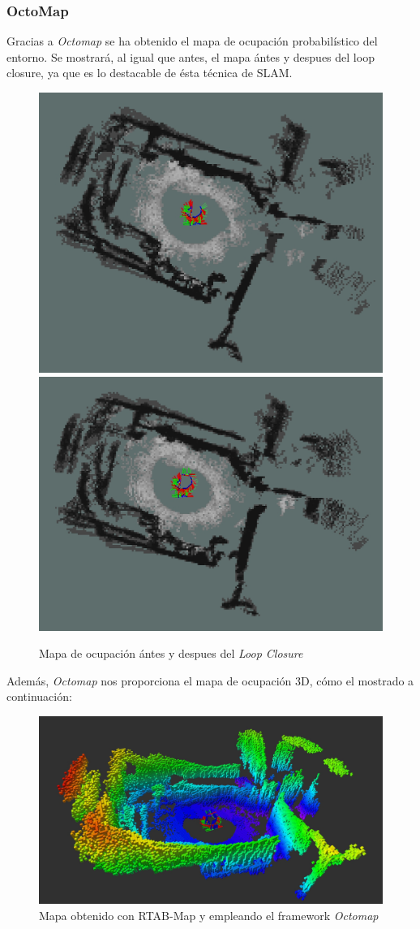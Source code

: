\newpage
    \subsubsection{OctoMap}
Gracias a \textit{Octomap} se ha obtenido el mapa de ocupación probabilístico del entorno. Se mostrará, al igual que antes, el mapa ántes y despues del loop closure, ya que es lo
destacable de ésta técnica de SLAM.
\begin{figure}[h!]
    \centering
    \includegraphics[width=.4\textwidth]{images/slam/bag3_occupGrid_noLC}
    \includegraphics[width=.435\textwidth]{images/slam/bag3_occupGrid_LC}
    \caption{Mapa de ocupación ántes y despues del \textit{Loop Closure}}
\end{figure}

Además, \textit{Octomap} nos proporciona el mapa de ocupación 3D, cómo el mostrado a continuación:
\begin{figure}[h!]
    \centering
    \includegraphics[width=.9\textwidth]{images/slam/bag3_octomap_LC}
    \caption{Mapa obtenido con RTAB-Map y empleando el framework \textit{Octomap}}
\end{figure}

